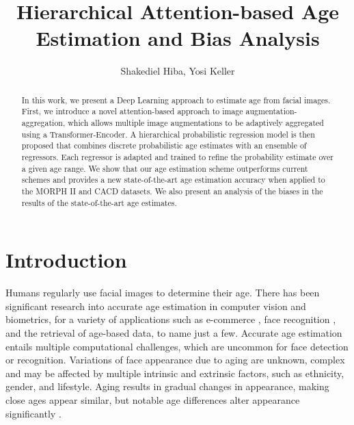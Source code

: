 \documentclass[10pt,journal]{IEEEtran}\usepackage{amsfonts}
\begin{document}
\title{Hierarchical Attention-based Age Estimation and Bias Analysis}
\author{Shakediel Hiba, Yosi Keller
}
\maketitle

\begin{abstract}
In this work, we present a Deep Learning approach to estimate age from facial
images. First, we introduce a novel attention-based approach to image
augmentation-aggregation, which allows multiple image augmentations to be
adaptively aggregated using a Transformer-Encoder. A hierarchical
probabilistic regression model is then proposed that combines discrete
probabilistic age estimates with an ensemble of regressors. Each regressor is
adapted and trained to refine the probability estimate over a given age range.
We show that our age estimation scheme outperforms current schemes and
provides a new state-of-the-art age estimation accuracy when applied to the
MORPH II and CACD datasets. We also present an analysis of the biases in the
results of the state-of-the-art age estimates.

\end{abstract}

\section{Introduction}

\label{sec:introduction}

Humans regularly use facial images to determine their age. There has been
significant research into accurate age estimation in computer vision and
biometrics, for a variety of applications such as e-commerce
\cite{Hakeem2012VideoAF}, face recognition \cite{Lanitis2004ComparingDC}, and the
retrieval of age-based data, to name just a few. Accurate age estimation
entails multiple computational challenges, which are uncommon for face detection or
recognition. Variations of face appearance due to aging are unknown, complex
and may be affected by multiple intrinsic and extrinsic factors, such as
ethnicity, gender, and lifestyle. Aging results in gradual changes in
appearance, making close ages appear similar, but notable age differences
alter appearance significantly \cite{Facial_Aging}.
\end{document}
